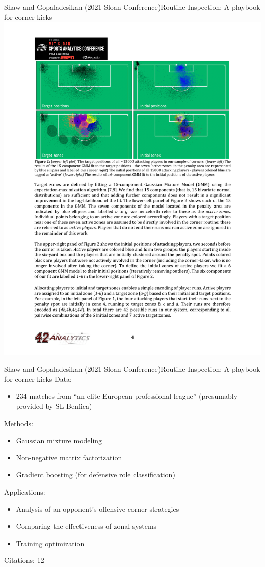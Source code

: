 \documentclass{beamer}
\begin{document}
  \begin{frame}{Shaw and Gopaladesikan (2021 Sloan Conference)}{Routine Inspection: A playbook for corner kicks}
    \centering
    \includegraphics[width = \textwidth]{images/shaw_gopaladesikan_2021.pdf}
  \end{frame}

  \begin{frame}{Shaw and Gopaladesikan (2021 Sloan Conference)}{Routine Inspection: A playbook for corner kicks}
    Data:
    \begin{itemize}
      \item 234 matches from ``an elite European professional league'' (presumably provided by SL Benfica)
    \end{itemize}
    Methods:
    \begin{itemize}
      \item Gaussian mixture modeling
      \item Non-negative matrix factorization
      \item Gradient boosting (for defensive role classification)
    \end{itemize}
    Applications:
    \begin{itemize}
      \item Analysis of an opponent's offensive corner strategies
      \item Comparing the effectiveness of zonal systems
      \item Training optimization
    \end{itemize}
    Citations: 12
  \end{frame}
\end{document}
